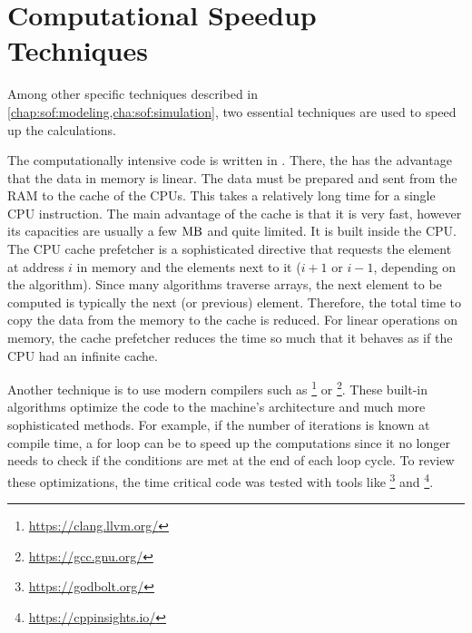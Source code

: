 \section{Computational Speedup Techniques}\label{sec:theorySpeedup}
%
Among other specific techniques described in \cref{chap:sof:modeling,cha:sof:simulation}, two essential techniques are used to speed up the calculations. 
\par
%
The computationally intensive code is written in \cpp{}.
There, the  has the advantage that the data in memory is linear.
The data must be prepared and sent from the \ac{RAM} to the cache of the \acp{CPU}.
This takes  a relatively long time for a single \ac{CPU} instruction.
The main advantage of the cache is that it is very fast, however its capacities are usually a few $\si{\mega\byte}$ and quite limited.
It is built inside the \ac{CPU}.
The \ac{CPU} cache prefetcher is a sophisticated directive that requests the element at address $i$ in memory and the elements next to it ($i+1$ or $i-1$, depending on the algorithm).
Since many algorithms traverse arrays, the next element to be computed is typically the next (or previous) element.
Therefore, the total time to copy the data from the memory to the cache is reduced.
For linear operations on memory, the cache prefetcher reduces the time so much that it behaves as if the \ac{CPU} had an infinite cache.
\par
%
Another technique is to use modern compilers such as \footnote{\url{https://clang.llvm.org/}} or \footnote{\url{https://gcc.gnu.org/}}.
These built-in algorithms optimize the code to the machine's architecture and much more sophisticated methods.
For example, if the number of iterations is known at compile time, a for loop can be  to speed up the computations since it no longer needs to check if the conditions  are met at the end of each loop cycle.
To review these optimizations, the time critical code was tested with tools like \footnote{\url{https://godbolt.org/}} and \footnote{\url{https://cppinsights.io/}}.
%
% 
% 
